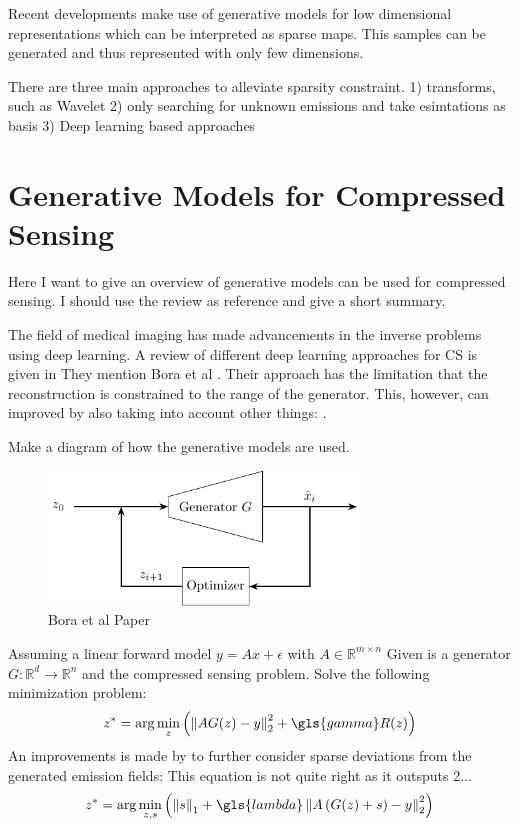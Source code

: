 Recent developments make use of generative models for low dimensional representations which can be interpreted as sparse maps.
This samples can be generated and thus represented with only few dimensions.

There are three main approaches to alleviate sparsity constraint.
1) transforms, such as Wavelet
2) only searching for unknown emissions and take esimtations as basis
3) Deep learning based approaches


\section{Generative Models for Compressed Sensing}
Here I want to give an overview of generative models can be used for compressed sensing.
I should use the review as reference and give a short summary.

The field of medical imaging has made advancements in the inverse problems using deep learning.
A review of different deep learning approaches for CS is given in \parencite{ReviewCSUsingAI}
They mention Bora et al \parencite{CSUsingAI}.
Their approach has the limitation that the reconstruction is constrained to the range of the generator.
This, however, can improved by also taking into account other things: \parencite{SparseCSUsingAI}.

Make a diagram of how the generative models are used.
\begin{figure}[h!]
    \centering
    \includegraphics[width=0.75\textwidth]{figures/02_related_work/latent_variable_optimization/build/latent_variable_optimization.pdf}
    \caption{Bora et al Paper}
\end{figure}

Assuming a linear forward model $y = Ax + \epsilon$ with $A \in \mathbb{R}^{m \times n}$
Given is a generator $G: \mathbb{R}^d \to \mathbb{R}^n$ and the compressed sensing problem.
Solve the following minimization problem:
\begin{equation}
    z^* = \arg\min_{z}{\left( \norm{A G(z) - y}_2^2 + \gls{gamma} R(z) \right)}
\end{equation}
An improvements is made by to further consider sparse deviations from the generated emission fields:
This equation is not quite right as it outsputs 2...
\begin{equation}
    z^* = \arg\min_{z, s}{\left(\norm{s}_1 + \gls{lambda} \norm{A \left( G(z) + s \right) - y}_2^2 \right)}
\end{equation}

